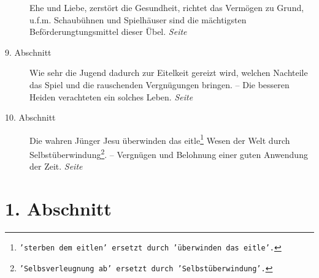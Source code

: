 \begin{description}
Ehe und Liebe, zerstört die Gesundheit, richtet das Vermögen zu Grund, u.f.m.
Schaubühnen und Spielhäuser sind die mächtigsten Beförderungtungsmittel dieser
Übel.
\dotfill \textit{Seite~\pageref{kap15_ab8}}\\
\item[9. Abschnitt] Wie sehr die Jugend dadurch zur Eitelkeit gereizt wird,
welchen Nachteile das Spiel und die rauschenden Vergnügungen bringen. -- Die
besseren Heiden verachteten ein solches Leben.
\dotfill \textit{Seite~\pageref{kap15_ab9}}\\
\item[10. Abschnitt] Die wahren Jünger Jesu überwinden das
eitle\footnote{\texttt{'sterben dem eitlen' ersetzt durch 'überwinden das
eitle'.}}
Wesen der Welt
durch Selbstüberwindung\footnote{\texttt{'Selbsverleugnung ab' ersetzt durch
'Selbstüberwindung'.}}. -- Vergnügen und Belohnung einer guten Anwendung der
Zeit.
\dotfill \textit{Seite~\pageref{kap15_ab10}}\\

\end{description}

\newpage

\section{1. Abschnitt} \label{kap15_ab1}

